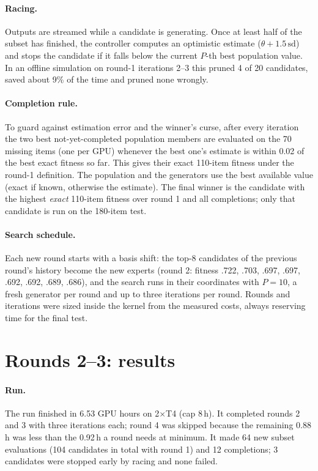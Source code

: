 \documentclass[10pt,a4paper]{article}
\begin{document}
\paragraph{Racing.} Outputs are streamed while a candidate is generating. Once at least half of the subset has finished, the controller computes an optimistic estimate ($\theta+1.5\,\text{sd}$) and stops the candidate if it falls below the current $P$-th best population value. In an offline simulation on round-1 iterations 2--3 this pruned 4 of 20 candidates, saved about 9\% of the time and pruned none wrongly.

\paragraph{Completion rule.} To guard against estimation error and the winner's curse, after every iteration the two best not-yet-completed population members are evaluated on the 70 missing items (one per GPU) whenever the best one's estimate is within 0.02 of the best exact fitness so far. This gives their exact 110-item fitness under the round-1 definition. The population and the generators use the best available value (exact if known, otherwise the estimate). The final winner is the candidate with the highest \emph{exact} 110-item fitness over round 1 and all completions; only that candidate is run on the 180-item test.

\paragraph{Search schedule.} Each new round starts with a basis shift: the top-8 candidates of the previous round's history become the new experts (round 2: fitness .722, .703, .697, .697, .692, .692, .689, .686), and the search runs in their coordinates with $P=10$, a fresh generator per round and up to three iterations per round. Rounds and iterations were sized inside the kernel from the measured costs, always reserving time for the final test.

\section{Rounds 2--3: results}\label{sec:r2res}
\paragraph{Run.} The run finished in 6.53 GPU hours on 2$\times$T4 (cap 8\,h). It completed rounds 2 and 3 with three iterations each; round 4 was skipped because the remaining 0.88\,h was less than the 0.92\,h a round needs at minimum. It made 64 new subset evaluations (104 candidates in total with round 1) and 12 completions; 3 candidates were stopped early by racing and none failed.
\end{document}
